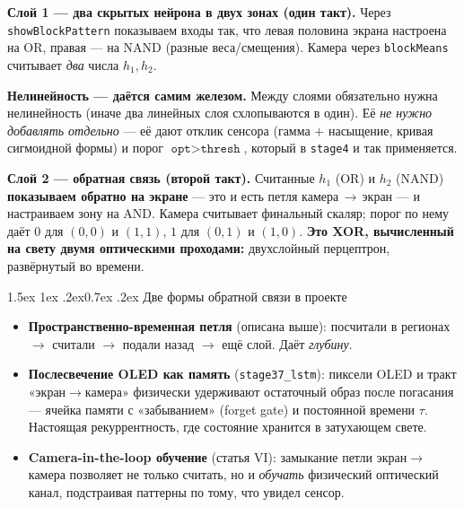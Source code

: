 \documentclass[11pt]{article}
\makeatletter
\renewcommand\section{\@startsection{section}{1}{\z@}%
  {1.5ex \@plus 1ex \@minus .2ex}{0.7ex \@plus.2ex}%
  {\sffamily\Large\bfseries\color{accent}}}
\makeatother
\begin{document}
\textbf{Слой 1 — два скрытых нейрона в двух зонах (один такт).} Через
\texttt{showBlockPattern} показываем входы так, что левая половина экрана
настроена на OR, правая — на NAND (разные веса/смещения). Камера через
\texttt{blockMeans} считывает \emph{два} числа $h_1,h_2$.

\textbf{Нелинейность — даётся самим железом.} Между слоями обязательно нужна
нелинейность (иначе два линейных слоя схлопываются в один). Её \emph{не нужно
добавлять отдельно} — её дают отклик сенсора (гамма $+$ насыщение, кривая
сигмоидной формы) и порог $\texttt{opt} > \texttt{thresh}$, который в
\texttt{stage4} и так применяется.

\begin{center}
\end{center}

\textbf{Слой 2 — обратная связь (второй такт).} Считанные $h_1$ (OR) и $h_2$
(NAND) \textbf{показываем обратно на экране} — это и есть петля
камера\,$\to$\,экран — и настраиваем зону на AND. Камера считывает финальный
скаляр; порог по нему даёт $0$ для $(0,0)$ и $(1,1)$, $1$ для $(0,1)$ и $(1,0)$.
\textbf{Это XOR, вычисленный на свету двумя оптическими проходами:} двухслойный
перцептрон, развёрнутый во времени.

\section{Две формы обратной связи в проекте}

\begin{itemize}
\item \textbf{Пространственно-временная петля} (описана выше): посчитали в
регионах $\to$ считали $\to$ подали назад $\to$ ещё слой. Даёт \emph{глубину}.
\item \textbf{Послесвечение OLED как память} (\texttt{stage37\_lstm}): пиксели
OLED и тракт «экран$\to$камера» физически удерживают остаточный образ после
погасания — ячейка памяти с «забыванием» (forget gate) и постоянной времени
$\tau$. Настоящая рекуррентность, где состояние хранится в затухающем свете.
\item \textbf{Camera-in-the-loop обучение} (статья VI): замыкание петли
экран$\to$камера позволяет не только считать, но и \emph{обучать} физический
оптический канал, подстраивая паттерны по тому, что увидел сенсор.
\end{itemize}
\end{document}
